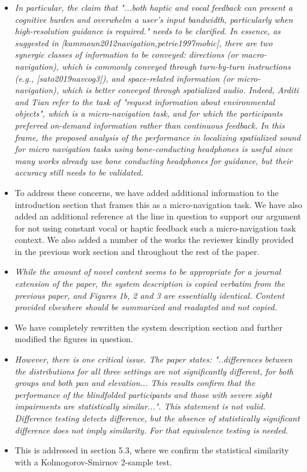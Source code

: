 \documentclass{scrartcl}
\begin{document}
\begin{itemize}
  \item \textit{In particular, the claim that "...both haptic and vocal feedback can present a cognitive burden and overwhelm a user’s input bandwidth, particularly when high-resolution guidance is required." needs to be clarified.
      In essence, as suggested in [kammoun2012navigation,petrie1997mobic], there are two synergic classes of information to be conveyed: directions (or macro-navigation), which is commonly conveyed through turn-by-turn instructions (e.g., [sato2019navcog3]), and space-related information (or micro-navigation), which is better conveyed through spatialized audio.
      Indeed, Arditi and Tian refer to the task of "request information about environmental objects", which is a micro-navigation task, and for which the participants preferred on-demand information rather than continuous feedback.
In this frame, the proposed analysis of the performance in localizing spatialized sound for micro navigation tasks using bone-conducting headphones is useful since many works already use bone conducting headphones for guidance, but their accuracy still needs to be validated.
}
  \item[] \noindent To address these concerns, we have added additional information to the introduction section that frames this as a micro-navigation task.
    We have also added an additional reference at the line in question to support our argument for not using constant vocal or haptic feedback such a micro-navigation task context.
    We also added a number of the works the reviewer kindly provided in the previous work section and throughout the rest of the paper. 

  \item \textit{While the amount of novel content seems to be appropriate for a journal extension of the paper, the system description is copied verbatim from the previous paper, and Figures 1b, 2 and 3 are essentially identical. Content provided elsewhere should be summarized and readapted and not copied.}
  \item []We have completely rewritten the system description section and further modified the figures in question.

  \item \textit{However, there is one critical issue. The paper states: "..differences between the distributions for all three settings are not significantly different, for both groups and both pan and elevation... This results confirm that the performance of the blindfolded participants and those with severe sight impairments are statistically similar...".
    This statement is not valid. Difference testing detects difference, but the absence of statistically significant difference does not imply similarity. For that equivalence testing is needed.}
  \item[] This is addressed in section 5.3, where we confirm the statistical similarity with a Kolmogorov-Smirnov 2-sample test. 


\end{itemize}
\end{document}

